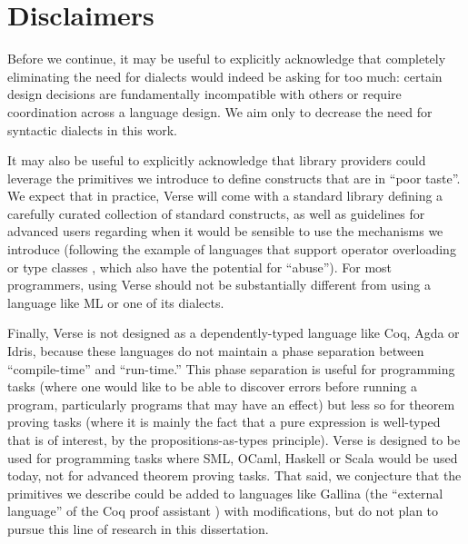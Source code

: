 \section{Disclaimers}
Before we continue, it may be useful to explicitly acknowledge that completely eliminating the need for dialects would indeed be asking for too much: certain design decisions are fundamentally incompatible with others or require coordination across a language design. We aim only to decrease the need for syntactic dialects in this work. %

It may also be useful to explicitly acknowledge that library providers could leverage the primitives we introduce   to define constructs that are in ``poor taste''. We  expect that in practice, Verse will come with a standard library defining a carefully curated collection of standard constructs, as well as guidelines for advanced users regarding when it would be sensible to use the mechanisms we introduce (following the example of languages that support operator overloading or type classes \cite{Hall:1996:TCH:227699.227700}, which also have the potential for ``abuse''). For most programmers, using Verse should not be substantially different from using a language like ML or one of its dialects.%

Finally, Verse is not designed as a dependently-typed language like Coq, Agda or Idris, because these languages do not maintain a phase separation between ``compile-time'' and ``run-time.'' This phase separation is useful for programming tasks (where one would like to be able to discover errors before running a program, particularly programs that may have an effect) but less so for theorem proving tasks (where it is mainly the fact that a pure expression is well-typed that is of interest, by the propositions-as-types principle). Verse is designed to be used for programming tasks where SML, OCaml, Haskell or Scala would be used today, not for advanced theorem proving tasks. That said, we conjecture that the primitives we describe could be added to languages like Gallina (the ``external language'' of the Coq proof assistant  \cite{Coq:manual}) with  modifications, but do not plan to pursue this line of research in this dissertation.